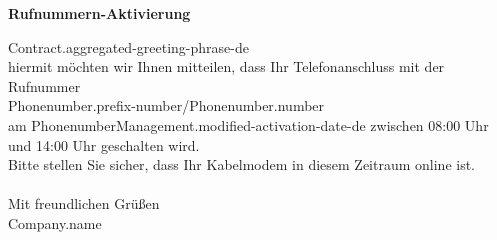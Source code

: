 \opening{\textbf{\Large{{Rufnummern-Aktivierung}}}}

{{Contract.aggregated-greeting-phrase-de}}\\

hiermit möchten wir Ihnen mitteilen, dass Ihr Telefonanschluss mit der Rufnummer\\

{{Phonenumber.prefix-number}}/{{Phonenumber.number}}\\

am {{PhonenumberManagement.modified-activation-date-de}} zwischen 08:00 Uhr und 14:00 Uhr geschalten wird.\\
Bitte stellen Sie sicher, dass Ihr Kabelmodem in diesem Zeitraum online ist.\\

~\\
Mit freundlichen Grüßen\\

{{Company.name}}
